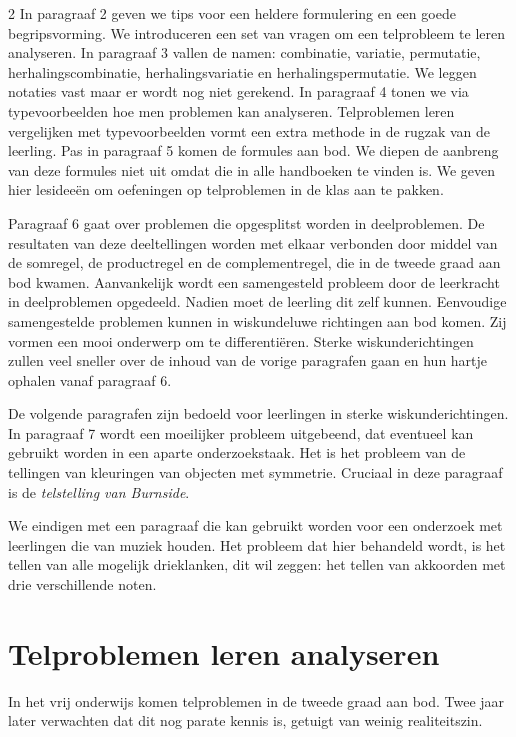 \begin{multicols}{2}
In paragraaf 2 geven we tips voor een heldere formulering en een goede begripsvorming. We introduceren een set van vragen om een telprobleem te leren analyseren. In paragraaf 3 vallen de namen: combinatie, variatie, permutatie, herhalingscombinatie, herhalingsvariatie en herhalingspermutatie. We leggen notaties vast maar er wordt nog niet gerekend. In paragraaf 4 tonen we via typevoorbeelden hoe men problemen kan analyseren. Telproblemen leren vergelijken met  typevoorbeelden vormt een extra methode in de rugzak van de leerling. Pas in paragraaf 5 komen de formules aan bod. We diepen de aanbreng van deze formules niet uit omdat die in alle handboeken te vinden is. We geven hier lesideeën om oefeningen op telproblemen in de klas aan te pakken. 

Paragraaf 6 gaat over problemen die opgesplitst worden in deelproblemen. De resultaten van deze deeltellingen worden met elkaar verbonden door middel van de somregel, de productregel en de complementregel, die in de tweede graad aan bod kwamen. Aanvankelijk wordt een samengesteld probleem door de leerkracht in deelproblemen opgedeeld. Nadien moet de leerling dit zelf kunnen. Eenvoudige samengestelde problemen kunnen in wiskundeluwe richtingen aan bod komen. Zij vormen een mooi onderwerp om te differentiëren. Sterke wiskunderichtingen zullen veel sneller over de inhoud van de vorige paragrafen gaan en hun hartje ophalen vanaf paragraaf 6.

De volgende paragrafen zijn bedoeld voor leerlingen in sterke wiskunderichtingen. In paragraaf 7  wordt een moeilijker probleem uitgebeend, dat eventueel kan gebruikt worden in een aparte onderzoekstaak. Het is het probleem van de tellingen van kleuringen van objecten met symmetrie. Cruciaal in deze paragraaf is de \emph{telstelling van Burnside}. 

We eindigen met een paragraaf die kan gebruikt worden voor een onderzoek met leerlingen die van muziek houden. Het probleem dat hier behandeld wordt, is het tellen van alle mogelijk drieklanken, dit wil zeggen: het tellen van akkoorden met drie verschillende noten.

\section{Telproblemen leren analyseren}
 
 In het vrij onderwijs komen telproblemen in de tweede graad aan bod. Twee jaar later verwachten dat dit nog parate kennis is, getuigt van weinig realiteitszin. 
 

\end{multicols}
